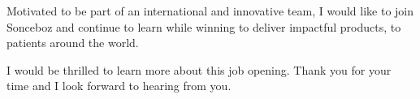 \documentclass[11pt, a4paper]{awesome-cv}
\begin{document}
\begin{cvletter}
Motivated to be part of an international and innovative team, I would like to join Sonceboz and continue to learn while winning to deliver impactful products, to patients around the world.

I would be thrilled to learn more about this job opening. Thank you for your time and I look forward to hearing from you.


\end{cvletter}

\makeletterclosing
\end{document}
